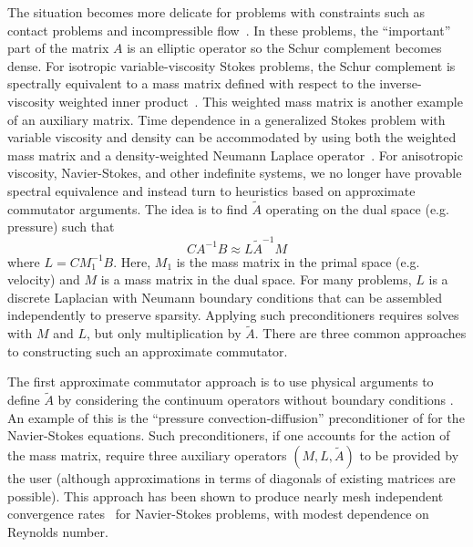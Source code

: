The situation becomes more delicate for problems with constraints such as contact problems and incompressible flow~\citep{elman2008tcp}.
In these problems, the ``important'' part of the matrix $A$ is an elliptic operator so the Schur complement becomes dense.
For isotropic variable-viscosity Stokes problems, the Schur complement is spectrally equivalent to a mass matrix defined with respect to the inverse-viscosity weighted inner product~\citep{olshanskii2006analysis}.
This weighted mass matrix is another example of an auxiliary matrix.
Time dependence in a generalized Stokes problem with variable viscosity and density can be accommodated by using both the weighted mass matrix and a density-weighted Neumann Laplace operator~\citep{olshanskii2006uniform}.
For anisotropic viscosity, Navier-Stokes, and other indefinite systems, we no longer have provable spectral equivalence and instead turn to heuristics based on approximate commutator arguments.
The idea is to find $\tilde A$ operating on the dual space (e.g. pressure) such that
\begin{equation*}
  C A^{-1} B \approx L \tilde A^{-1} M
\end{equation*}
where $L = CM_1^{-1}B$.
Here, $M_1$ is the mass matrix in the primal space (e.g. velocity) and $M$ is a mass matrix in the dual space.
For many problems, $L$ is a discrete Laplacian with Neumann boundary conditions that can be assembled independently to preserve sparsity.
Applying such preconditioners requires solves with $M$ and $L$, but only multiplication by $\tilde A$.
There are three common approaches to constructing such an approximate commutator.

The first approximate commutator approach is to use physical arguments to define $\tilde A$ by considering the continuum operators without boundary conditions \citep[though see][]{elman2009boundary}.
An example of this is the ``pressure convection-diffusion'' preconditioner of \citet{silvester2001efficient,kay2002pss} for the Navier-Stokes equations.
Such preconditioners, if one accounts for the action of the mass matrix, require three auxiliary operators $(M,L,\tilde A)$ to be provided by the user (although approximations in terms of diagonals of existing matrices are possible).
This approach has been shown to produce nearly mesh independent convergence rates~\citep{elman2005psm,deniet2007tps,elman2008tcp} for Navier-Stokes problems, with modest dependence on Reynolds number.

